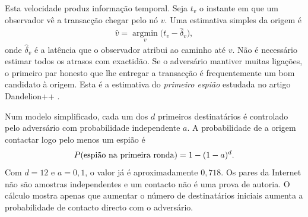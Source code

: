 Esta velocidade produz informação temporal. Seja \(t_v\) o instante em que um
observador vê a transacção chegar pelo nó \(v\). Uma estimativa simples da
origem é
\begin{align}
 \widehat v=\underset{v}{\operatorname{argmin}}
       \bigl(t_v-\widehat\delta_v\bigr),
 \label{eq:dandelion-timing-estimator}
\end{align}
onde \(\widehat\delta_v\) é a latência que o observador atribui ao caminho até
\(v\). Não é necessário estimar todos os atrasos com exactidão. Se o
adversário mantiver muitas ligações, o primeiro par honesto que lhe entregar a
transacção é
frequentemente um bom candidato à origem. Esta é a estimativa do
\emph{primeiro espião} estudada no artigo Dandelion++
\cite{dandelion-plus-plus}.

Num modelo simplificado, cada um dos \(d\) primeiros destinatários é
controlado pelo adversário com probabilidade independente \(a\). A
probabilidade de a origem contactar logo pelo menos um espião é
\begin{align}
 P(\hbox{espião na primeira ronda})=1-(1-a)^d.
 \label{eq:dandelion-flood-first-round}
\end{align}
Com \(d=12\) e \(a=0{,}1\), o valor já é aproximadamente \(0{,}718\). Os
pares da Internet não são amostras independentes e um contacto não é uma prova
de autoria. O cálculo mostra apenas que aumentar o número de destinatários
iniciais aumenta a probabilidade de contacto directo com o adversário.

\begin{center}
\end{center}

